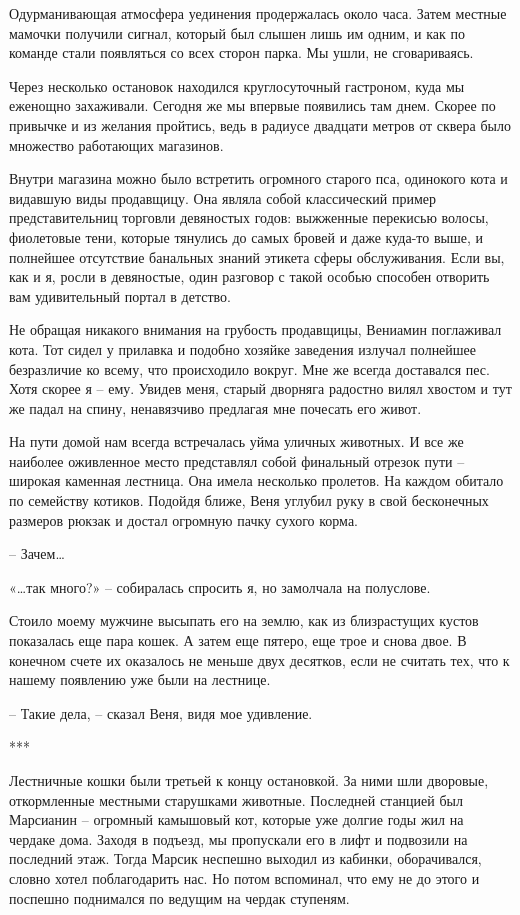 \documentclass[
]{book}
\begin{document}
Одурманивающая атмосфера уединения продержалась около часа. Затем местные мамочки получили сигнал, который был слышен лишь им одним, и как по команде стали появляться со всех сторон парка. Мы ушли, не сговариваясь.

Через несколько остановок находился круглосуточный гастроном, куда мы еженощно захаживали. Сегодня же мы впервые появились там днем. Скорее по привычке и из желания пройтись, ведь в радиусе двадцати метров от сквера было множество работающих магазинов.

Внутри магазина можно было встретить огромного старого пса, одинокого кота и видавшую виды продавщицу. Она являла собой классический пример представительниц торговли девяностых годов: выжженные перекисью волосы, фиолетовые тени, которые тянулись до самых бровей и даже куда-то выше, и полнейшее отсутствие банальных знаний этикета сферы обслуживания. Если вы, как и я, росли в девяностые, один разговор с такой особью способен отворить вам удивительный портал в детство.

Не обращая никакого внимания на грубость продавщицы, Вениамин поглаживал кота. Тот сидел у прилавка и подобно хозяйке заведения излучал полнейшее безразличие ко всему, что происходило вокруг. Мне же всегда доставался пес. Хотя скорее я -- ему. Увидев меня, старый дворняга радостно вилял хвостом и тут же падал на спину, ненавязчиво предлагая мне почесать его живот.

На пути домой нам всегда встречалась уйма уличных животных. И все же наиболее оживленное место представлял собой финальный отрезок пути -- широкая каменная лестница. Она имела несколько пролетов. На каждом обитало по семейству котиков. Подойдя ближе, Веня углубил руку в свой бесконечных размеров рюкзак и достал огромную пачку сухого корма.

-- Зачем\ldots{}

«\ldots так много?» -- собиралась спросить я, но замолчала на полуслове.

Стоило моему мужчине высыпать его на землю, как из близрастущих кустов показалась еще пара кошек. А затем еще пятеро, еще трое и снова двое. В конечном счете их оказалось не меньше двух десятков, если не считать тех, что к нашему появлению уже были на лестнице.

-- Такие дела, -- сказал Веня, видя мое удивление.

***

Лестничные кошки были третьей к концу остановкой. За ними шли дворовые, откормленные местными старушками животные. Последней станцией был Марсианин -- огромный камышовый кот, которые уже долгие годы жил на чердаке дома. Заходя в подъезд, мы пропускали его в лифт и подвозили на последний этаж. Тогда Марсик неспешно выходил из кабинки, оборачивался, словно хотел поблагодарить нас. Но потом вспоминал, что ему не до этого и поспешно поднимался по ведущим на чердак ступеням.
\end{document}
